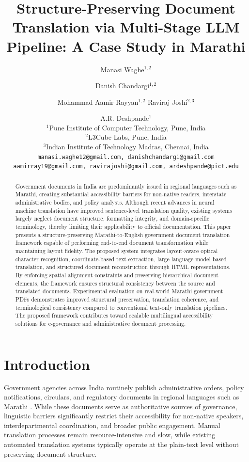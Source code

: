 \documentclass[11pt]{article}
\title{Structure-Preserving Document Translation via Multi-Stage LLM Pipeline: A Case Study in Marathi}
\author{
Manasi Waghe$^{1,2}$ \and
Danish Chandargi$^{1,2}$ \and
Mohammad Aamir Rayyan$^{1,2}$
\AND
Raviraj Joshi$^{2,3}$ \and
A.R. Deshpande$^{1}$ \\
$^{1}$Pune Institute of Computer Technology, Pune, India \\
$^{2}$L3Cube Labs, Pune, India \\
$^{3}$Indian Institute of Technology Madras, Chennai, India \\
\texttt{manasi.waghe12@gmail.com, danishchandargi@gmail.com} \\
\texttt{aamirray19@gmail.com, ravirajoshi@gmail.com, ardeshpande@pict.edu}
}
\begin{document}
\maketitle
\begin{abstract}
Government documents in India are predominantly issued in regional languages such as Marathi, creating substantial accessibility barriers for non-native readers, interstate administrative bodies, and policy analysts. Although recent advances in neural machine translation have improved sentence-level translation quality, existing systems largely neglect document structure, formatting integrity, and domain-specific terminology, thereby limiting their applicability to official documentation. This paper presents a structure-preserving Marathi-to-English government document translation framework capable of performing end-to-end document transformation while maintaining layout fidelity. The proposed system integrates layout-aware optical character recognition, coordinate-based text extraction, large language model based translation, and structured document reconstruction through HTML representations. By enforcing spatial alignment constraints and preserving hierarchical document elements, the framework ensures structural consistency between the source and translated documents. Experimental evaluation on real-world Marathi government PDFs demonstrates improved structural preservation, translation coherence, and terminological consistency compared to conventional text-only translation pipelines. The proposed framework contributes toward scalable multilingual accessibility solutions for e-governance and administrative document processing.
\end{abstract}

\section{Introduction}

Government agencies across India routinely publish administrative orders, policy notifications, circulars, and regulatory documents in regional languages such as Marathi \cite{joshi2022l3cube_mahacorpus}. While these documents serve as authoritative sources of governance, linguistic barriers significantly restrict their accessibility for non-native speakers, interdepartmental coordination, and broader public engagement. Manual translation processes remain resource-intensive and slow, while existing automated translation systems typically operate at the plain-text level without preserving document structure.
\end{document}
